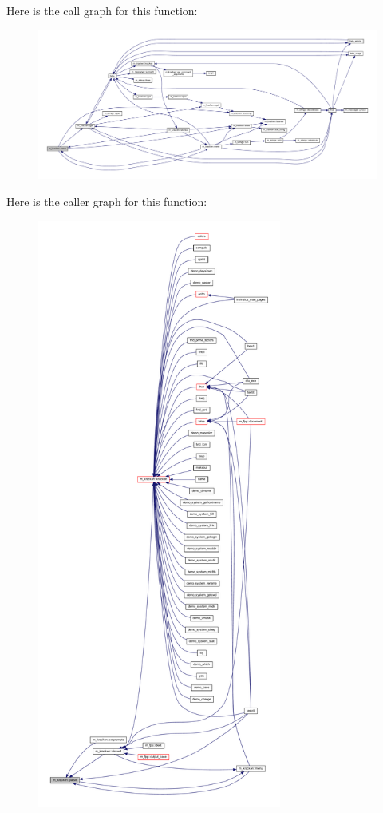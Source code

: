 Here is the call graph for this function\+:
\nopagebreak
\begin{figure}[H]
\begin{center}
\leavevmode
\includegraphics[width=350pt]{namespacem__kracken_a495ed7db5c2d301c4d5e623b62a9c295_cgraph}
\end{center}
\end{figure}
Here is the caller graph for this function\+:
\nopagebreak
\begin{figure}[H]
\begin{center}
\leavevmode
\includegraphics[height=550pt]{namespacem__kracken_a495ed7db5c2d301c4d5e623b62a9c295_icgraph}
\end{center}
\end{figure}
\mbox{\label{namespacem__kracken_ad4f3d7c793c90789b175097b433035da}} 
